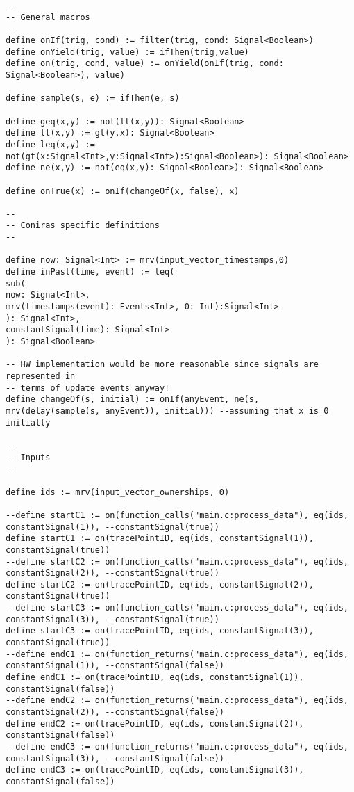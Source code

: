 \documentclass{article}
\begin{document}
\begin{lstlisting}[language=tessla+salt]
--
-- General macros
--
define onIf(trig, cond) := filter(trig, cond: Signal<Boolean>)
define onYield(trig, value) := ifThen(trig,value)
define on(trig, cond, value) := onYield(onIf(trig, cond: Signal<Boolean>), value)

define sample(s, e) := ifThen(e, s)

define geq(x,y) := not(lt(x,y)): Signal<Boolean>
define lt(x,y) := gt(y,x): Signal<Boolean>
define leq(x,y) := not(gt(x:Signal<Int>,y:Signal<Int>):Signal<Boolean>): Signal<Boolean>
define ne(x,y) := not(eq(x,y): Signal<Boolean>): Signal<Boolean>

define onTrue(x) := onIf(changeOf(x, false), x)

--
-- Coniras specific definitions
--

define now: Signal<Int> := mrv(input_vector_timestamps,0)
define inPast(time, event) := leq(
sub(
now: Signal<Int>,
mrv(timestamps(event): Events<Int>, 0: Int):Signal<Int>
): Signal<Int>,
constantSignal(time): Signal<Int>
): Signal<Boolean>

-- HW implementation would be more reasonable since signals are represented in
-- terms of update events anyway!
define changeOf(s, initial) := onIf(anyEvent, ne(s, mrv(delay(sample(s, anyEvent)), initial))) --assuming that x is 0 initially

--
-- Inputs
--

define ids := mrv(input_vector_ownerships, 0)

--define startC1 := on(function_calls("main.c:process_data"), eq(ids, constantSignal(1)), --constantSignal(true))
define startC1 := on(tracePointID, eq(ids, constantSignal(1)), constantSignal(true))
--define startC2 := on(function_calls("main.c:process_data"), eq(ids, constantSignal(2)), --constantSignal(true))
define startC2 := on(tracePointID, eq(ids, constantSignal(2)), constantSignal(true))
--define startC3 := on(function_calls("main.c:process_data"), eq(ids, constantSignal(3)), --constantSignal(true))
define startC3 := on(tracePointID, eq(ids, constantSignal(3)), constantSignal(true))
--define endC1 := on(function_returns("main.c:process_data"), eq(ids, constantSignal(1)), --constantSignal(false))
define endC1 := on(tracePointID, eq(ids, constantSignal(1)), constantSignal(false))
--define endC2 := on(function_returns("main.c:process_data"), eq(ids, constantSignal(2)), --constantSignal(false))
define endC2 := on(tracePointID, eq(ids, constantSignal(2)), constantSignal(false))
--define endC3 := on(function_returns("main.c:process_data"), eq(ids, constantSignal(3)), --constantSignal(false))
define endC3 := on(tracePointID, eq(ids, constantSignal(3)), constantSignal(false))


\end{lstlisting}
\end{document}
